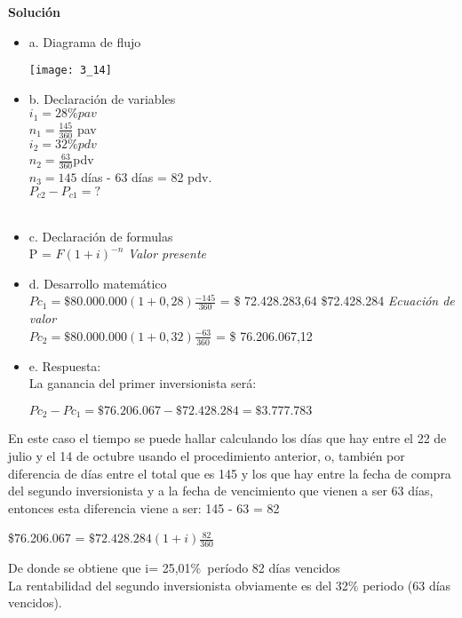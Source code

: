 	\textbf{Solución}\\
	\begin{itemize}
		\item a. Diagrama de flujo\\
		\begin{center}
			\texttt{[image: 3\_14]}
		\end{center}
		\item b. Declaración de variables\\
		$i_{1} = 28\% pav$ \\
		$n_{1} = \frac{145}{360}$ pav\\
		$i_{2} = 32 \% pdv$\\
		$n_{2} =\frac{63}{360}$pdv\\ 
		 $n_{3} = 145$ días - 63 días = 82 pdv.\\

			$P_{c2}-P_{c1} = ?$\\\\

		\item c. Declaración de formulas\\
		
			P = $F(1+i)^{-n}$ \hspace{35}\textit{Valor presente}\\
		
		\item d. Desarrollo matemático\\
		$Pc_1 = \$80.000.000(1+0,28)\frac{-145}{360}$ = \$ 72.428.283,64 \simeq \$72.428.284 \hspace{35}\textit{Ecuación de valor}\\
		$Pc_2 = \$80.000.000(1+0,32)\frac{-63}{360}$ = \$ 76.206.067,12\\ 
		\item e. Respuesta:\\
		La ganancia del primer inversionista será:\\
		\begin{center}
			$Pc_2 - Pc_1 = \$76.206.067 - \$72.428.284 = \$3.777.783$\\
		\end{center}
	\end{itemize}
	En este caso el tiempo se puede hallar calculando los días que hay entre el 22 de julio y el 14 de octubre usando el procedimiento anterior, o, también por diferencia de días entre el total que es 145 y los que hay entre la fecha de compra del segundo inversionista y a la fecha de vencimiento que vienen a ser 63 días, entonces esta diferencia viene a ser: 145 - 63 = 82
	\begin{center}
		\$76.206.067 = $\$72.428.284(1+i)\frac{82}{360}$
	\end{center}
	De donde se obtiene que i= 25,01\%\ período 82 días vencidos \\
	La rentabilidad del segundo inversionista obviamente es del 32\% periodo (63 días vencidos).

